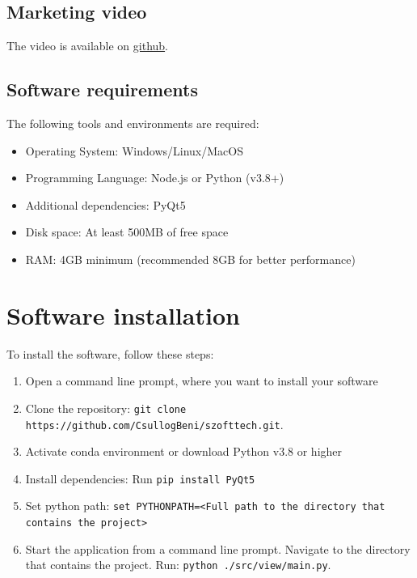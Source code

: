 \documentclass{article}
\begin{document}
\subsection{Marketing video}

The video is available on \href{https://github.com/CsullogBeni/szofttech/tree/main/documentation/video}{github}.

\subsection{Software requirements}

The following tools and environments are required:

\begin{itemize}
    \item Operating System\@: Windows/Linux/MacOS
    \item Programming Language\@: Node.js or Python (v3.8+)
    \item Additional dependencies\@: PyQt5
    \item Disk space\@: At least 500MB of free space
    \item RAM\@: 4GB minimum (recommended 8GB for better performance)
\end{itemize}

\section{Software installation}

To install the software, follow these steps:

\begin{enumerate}
    \item Open a command line prompt, where you want to install your software
    \item Clone the repository\@: \texttt{git clone https://github.com/CsullogBeni/szofttech.git}.
    \item Activate conda environment or download Python v3.8 or higher
    \item Install dependencies\@: Run \texttt{pip install PyQt5}
    \item Set python path: \texttt{set PYTHONPATH=<Full path to the directory that contains the project>}
    \item Start the application from a command line prompt. Navigate to the directory that contains the project. Run: \@\texttt{python ./src/view/main.py}.
\end{enumerate}
\end{document}
